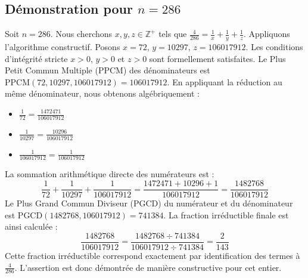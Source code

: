 \documentclass[11pt,a4paper]{article}
\begin{document}
\subsection{Démonstration pour $n = 286$}
Soit $n = 286$. Nous cherchons $x, y, z \in \mathbb{Z}^{+}$ tels que $\frac{4}{286} = \frac{1}{x} + \frac{1}{y} + \frac{1}{z}$.
Appliquons l'algorithme constructif. Posons $x = 72$, $y = 10297$, $z = 106017912$.
Les conditions d'intégrité stricte $x > 0$, $y > 0$ et $z > 0$ sont formellement satisfaites.
Le Plus Petit Commun Multiple (PPCM) des dénominateurs est $\text{PPCM}(72, 10297, 106017912) = 106017912$.
En appliquant la réduction au même dénominateur, nous obtenons algébriquement :
\begin{itemize}
    \item $\frac{1}{72} = \frac{1472471}{106017912}$
    \item $\frac{1}{10297} = \frac{10296}{106017912}$
    \item $\frac{1}{106017912} = \frac{1}{106017912}$
\end{itemize}
La sommation arithmétique directe des numérateurs est :
$$ \frac{1}{72} + \frac{1}{10297} + \frac{1}{106017912} = \frac{1472471 + 10296 + 1}{106017912} = \frac{1482768}{106017912} $$
Le Plus Grand Commun Diviseur (PGCD) du numérateur et du dénominateur est $\text{PGCD}(1482768, 106017912) = 741384$.
La fraction irréductible finale est ainsi calculée :
$$ \frac{1482768}{106017912} = \frac{1482768 \div 741384}{106017912 \div 741384} = \frac{2}{143} $$
Cette fraction irréductible correspond exactement par identification des termes à $\frac{4}{286}$. L'assertion est donc démontrée de manière constructive pour cet entier.
\end{document}

